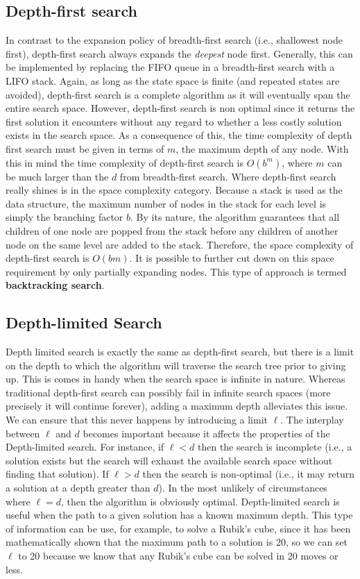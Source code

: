 \documentclass[a4paper,11pt]{report}
\begin{document}
\subsection{Depth-first search}
In contrast to the expansion policy of breadth-first search (i.e., shallowest
node first), depth-first search always expands the \textit{deepest} node first.
Generally, this can be implemented by replacing the FIFO queue in a 
breadth-first search with a LIFO stack.\cite{norvig}  Again, as long as the
state space is finite (and repeated states are avoided), depth-first search is
a complete algorithm as it will eventually span the entire search
space.\cite{norvig} However, depth-first search is non optimal since it returns
the first solution it encounters without any regard to whether a less
costly solution exists in the search space. As a consequence of this, the time
complexity of depth first search must be given in terms of $m$, the
maximum depth of any node.  With this in mind the time complexity of depth-first
search is $O(b^m)$, where $m$ can be much larger than the $d$ from
breadth-first search.\cite{norvig} Where depth-first search really shines is in
the space complexity category.  Because a stack is used as the data structure,
the maximum number of nodes in the stack for each level is simply the branching
factor $b$.  By its nature, the algorithm guarantees that all children
of one node are popped from the stack before any children of another node on
the same level are added to the stack.  Therefore, the space complexity of 
depth-first search is $O(bm)$.  It is possible to further cut down on this 
space requirement by only partially expanding nodes.  This type of approach is
termed \textbf{backtracking search}.\cite{norvig} 

\subsection{Depth-limited Search}
Depth limited search is exactly the same as depth-first search, but there is a
limit on the depth to which the algorithm will traverse the search tree prior
to giving up.  This is comes in handy when the search space is infinite in
nature.  Whereas traditional depth-first search can possibly fail in infinite
search spaces (more precisely it will continue forever), adding a maximum depth
alleviates this issue.\cite{norvig} We can ensure that this never happens by
introducing a limit $\ell$.  The interplay between $\ell$ and $d$ becomes
important because it affects the properties of the Depth-limited search.  For
instance, if $\ell < d$ then the search is incomplete (i.e., a solution exists
but the search will exhaust the available search space without finding that
solution). If $\ell > d$ then the search is non-optimal (i.e., it may return a
solution at a depth greater than $d$).\cite{norvig}  In the most unlikely of
circumstances where $\ell = d$, then the algorithm is obviously optimal.
Depth-limited search is useful when the path to a given solution has a known
maximum depth. This type of information can be use, for example, to solve a
Rubik's cube, since it has been mathematically shown that the maximum path to a
solution is 20, so we can set $\ell$ to 20 because we know that any Rubik's
cube can be solved in 20 moves or less.\cite{god20}
\end{document}
